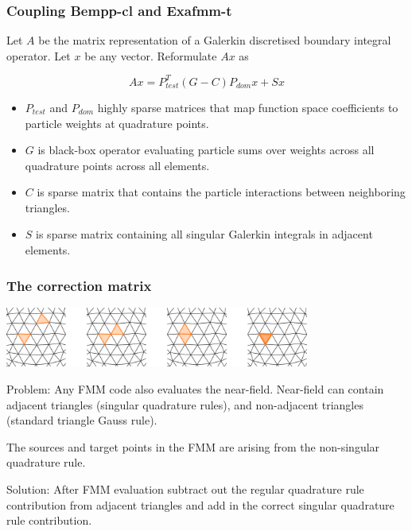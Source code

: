 \documentclass[dvipsnames,10pt]{beamer}
\begin{document}
\begin{frame}
    \frametitle{Coupling Bempp-cl and Exafmm-t}

Let $A$ be the matrix representation of a Galerkin discretised boundary integral operator.
Let $x$ be any vector. Reformulate $Ax$ as

$$
Ax = P_{test}^T(G - C)P_{dom}x + Sx
$$

\begin{itemize}
    \item $P_{test}$ and $P_{dom}$ highly sparse matrices that map function space coefficients to particle weights at quadrature points.    \item $G$ is black-box operator evaluating particle sums over weights across all quadrature points across all elements.
    \item $C$ is sparse matrix that contains the particle interactions between neighboring triangles.
    \item $S$ is sparse matrix containing all singular Galerkin integrals in adjacent elements.
\end{itemize}

\end{frame}

\begin{frame}
    \frametitle{The correction matrix}

    \begin{center}
        \includegraphics[width=10cm]{../figs/triangles.png}
    \end{center}

    Problem: Any FMM code also evaluates the near-field.
    Near-field can contain adjacent triangles (singular quadrature rules), and
    non-adjacent triangles (standard triangle Gauss rule).

    \vspace{.5cm}

    The sources and target points in the FMM are arising from the
    non-singular quadrature rule.

    \vspace{.5cm}

    Solution: After FMM evaluation subtract out the regular quadrature rule
    contribution from adjacent triangles and add in the correct singular quadrature
    rule contribution.

\end{frame}
\end{document}
